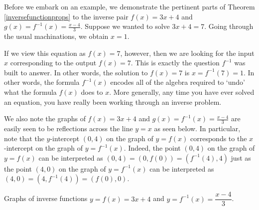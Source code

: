 \documentclass{ximera}
\begin{document}
\smallskip

Before we embark on an example, we demonstrate the pertinent parts of Theorem \ref{inversefunctionprops}  to the inverse pair $f(x) = 3x+4$ and $g(x) = f^{-1}(x) =  \frac{x-4}{3}$.  Suppose we wanted to solve $3x+4 = 7$.  Going through the usual machinations, we obtain $x = 1$.  

\smallskip

If we view this equation as $f(x) = 7$, however, then we are looking for the input $x$  corresponding to the output $f(x) = 7$.  This is exactly the question $f^{-1}$ was built to answer.  In other words, the solution to  $f(x) = 7$ is  $x = f^{-1}(7) =1$. In other words, the formula $f^{-1}(x)$ encodes all of the algebra required to `undo' what the formula $f(x)$ does to $x$.   More generally,  any time you have ever solved an equation, you have really been working through an inverse problem.

\smallskip


We also note the graphs of   $f(x) = 3x+4$ and $g(x) = f^{-1}(x) = \frac{x-4}{3}$ are easily seen to be reflections across the line $y=x$ as seen below.  In particular, note that the $y$-intercept $(0,4)$ on the graph of $y = f(x)$ corresponds to the $x$-intercept on the graph of $y = f^{-1}(x)$.  Indeed, the point $(0,4)$ on the graph of $y = f(x)$ can be interpreted as $(0,4) = (0,f(0)) = (f^{-1}(4), 4)$ just as the point $(4,0)$ on the graph of $y = f^{-1}(x)$ can be interpreted as $(4,0) = (4, f^{-1}(4)) = (f(0), 0)$.

\begin{center}

% 


Graphs of inverse functions $y = f(x) =3x+4 $ and $y =  f^{-1}(x) =  \dfrac{x-4}{3}$.

\enlargethispage{0.1in}

\end{center}
\end{document}
